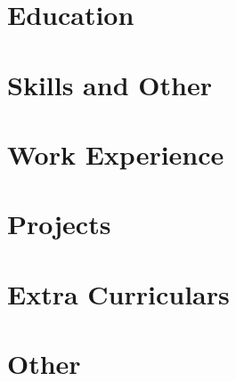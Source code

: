 \documentclass[a4paper,12pt]{article}
\begin{document}
\pagestyle{empty} 



\section{Education}

    
\section{Skills and Other}



\section{Work Experience}





\vspace{-2pt}



\section{Projects}









\section{Extra Curriculars}



\section{Other}


\end{document}
